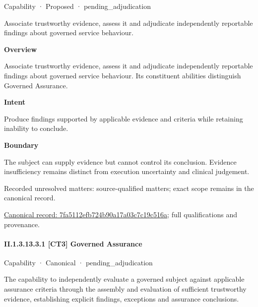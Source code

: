 \label{element:7fa5112efb724b90a17a03c7c19c516a}
{\small Capability · Proposed · pending\_adjudication}\par

Associate trustworthy evidence, assess it and adjudicate independently reportable findings about governed service behaviour.



\textbf{Overview}



Associate trustworthy evidence, assess it and adjudicate independently reportable findings about governed service behaviour. Its constituent abilities distinguish Governed Assurance.



\textbf{Intent}



Produce findings supported by applicable evidence and criteria while retaining inability to conclude.



\textbf{Boundary}



The subject can supply evidence but cannot control its conclusion. Evidence insufficiency remains distinct from execution uncertainty and clinical judgement.


{\small Recorded unresolved matters: source-qualified matters; exact scope remains in the canonical record.}\par
{\footnotesize \href{../../../../continuum/strategy/capability/7fa5112efb724b90a17a03c7c19c516a.md}{Canonical record: 7fa5112efb724b90a17a03c7c19c516a}; full qualifications and provenance.}\par
\paragraph*{II.1.3.13.3.1 [CT3] Governed Assurance}
\label{navigation:II.1.3.13.3.1}

\label{element:da1a983d4dcf4d5bb772b8f69bc08426}
{\small Capability · Canonical · pending\_adjudication}\par

The capability to independently evaluate a governed subject against applicable assurance criteria through the assembly and evaluation of sufficient trustworthy evidence, establishing explicit findings, exceptions and assurance conclusions.



